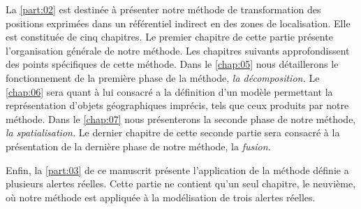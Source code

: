 La \autoref{part:02} est destinée à présenter notre méthode de
transformation des positions exprimées dans un référentiel indirect en
des zones de localisation. Elle est constituée de cinq chapitres. Le
premier chapitre de cette partie présente l’organisation générale de
notre méthode. Les chapitres suivants approfondissent des points
spécifiques de cette méthode. Dans le \autoref{chap:05} nous
détaillerons le fonctionnement de la première phase de la méthode,
\emph{la décomposition.} Le \autoref{chap:06} sera quant à lui
consacré a la définition d'un modèle permettant la représentation
d'objets géographiques imprécis, tels que ceux produits par notre
méthode. Dans le \autoref{chap:07} nous présenterons la seconde phase
de notre méthode, \emph{la spatialisation.} Le dernier chapitre de
cette seconde partie sera consacré à la présentation de la dernière
phase de notre méthode, la \emph{fusion.}

Enfin, la \autoref{part:03} de ce manuscrit présente l’application de
la méthode définie a plusieurs alertes réelles. Cette partie ne
contient qu'un seul chapitre, le neuvième, où notre méthode est
appliquée à la modélisation de trois alertes réelles.


